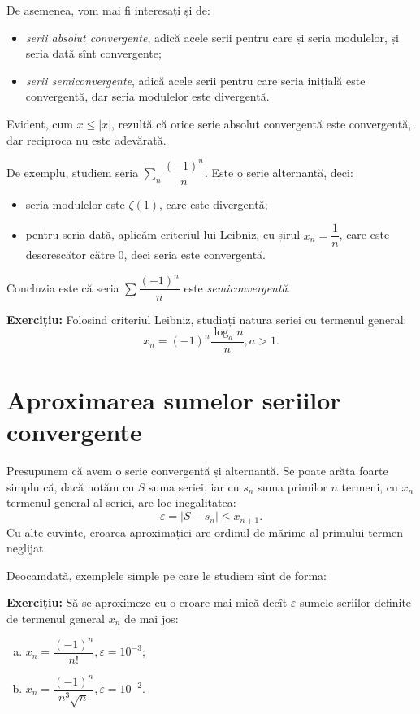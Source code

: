 De asemenea, vom mai fi interesați și de:
\begin{itemize}
    \item \emph{serii absolut convergente}, adică acele serii pentru care și
        seria modulelor, și seria dată sînt convergente;
    \item \emph{serii semiconvergente}, adică acele serii pentru care seria
        inițială este convergentă, dar seria modulelor este divergentă.
\end{itemize}

Evident, cum $ x \leq |x| $, rezultă că orice serie absolut convergentă este
convergentă, dar reciproca nu este adevărată.

De exemplu, studiem seria $ \sum_n \dfrac{(-1)^n}{n} $. Este o serie
alternantă, deci:
\begin{itemize}
    \item seria modulelor este $ \zeta(1) $, care este divergentă;
    \item pentru seria dată, aplicăm criteriul lui Leibniz, cu șirul $ x_n = \dfrac{1}{n} $,
        care este descrescător către 0, deci seria este convergentă.
\end{itemize}

Concluzia este că seria $ \sum \dfrac{(-1)^n}{n} $ este \emph{semiconvergentă}.

\textbf{Exercițiu:} Folosind criteriul Leibniz, studiați natura seriei cu termenul general:
\[
    x_n = (-1)^n \dfrac{\log_a n}{n}, a > 1.
\]

\section{Aproximarea sumelor seriilor convergente}

Presupunem că avem o serie convergentă și alternantă. Se poate arăta foarte
simplu că, dacă notăm cu $ S $ suma seriei, iar cu $ s_n $ suma primilor $ n $
termeni, cu $ x_n $ termenul general al seriei, are loc inegalitatea:
\begin{equation}\label{eq:aprox}
    \varepsilon = | S - s_n | \leq x_{n + 1}.
\end{equation}
Cu alte cuvinte, eroarea aproximației are ordinul de mărime al primului
termen neglijat.

Deocamdată, exemplele simple pe care le studiem sînt de forma:

\textbf{Exercițiu:} Să se aproximeze cu o eroare mai mică decît $ \varepsilon $
sumele seriilor definite de termenul general $ x_n $ de mai jos:
\begin{enumerate}[(a)]
    \item $ x_n = \dfrac{(-1)^n}{n!}, \varepsilon = 10^{-3} $;
    \item $ x_n = \dfrac{(-1)^n}{n^3 \sqrt{n}}, \varepsilon = 10^{-2} $.
\end{enumerate}

